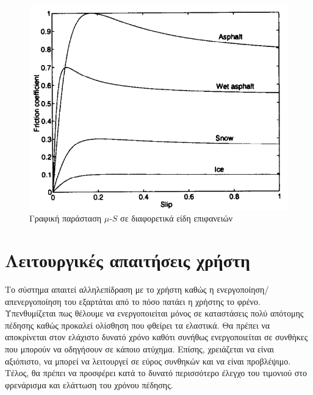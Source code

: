 \documentclass{article}
\begin{document}
\begin{figure}[H]
    \begin{center}
    \includegraphics[scale=0.4]{images/slip-friction-diagram.png}
    \end{center}
    \caption{Γραφική παράσταση $\mu$-$S$ σε διαφορετικά είδη επιφανειών \cite{10.1016/S0005-1098(97)00003-4}}
    \label{fig:slip-friction-diagram}
\end{figure}

\section{Λειτουργικές απαιτήσεις χρήστη}
Το σύστημα απαιτεί αλληλεπίδραση με το χρήστη καθώς η ενεργοποίηση/απενεργο\-ποίηση του εξαρτάται από το πόσο πατάει η χρήστης το φρένο. Υπενθυμίζεται πως θέλουμε να ενεργοποιείται μόνος σε καταστάσεις πολύ απότομης πέδησης καθώς προκαλεί ολίσθηση που φθείρει τα ελαστικά. Θα πρέπει να αποκρίνεται στον ελάχιστο δυνατό χρόνο καθότι συνήθως ενεργοποιείται σε συνθήκες που μπορούν να οδηγήσουν σε κάποιο ατύχημα. Επίσης, χρειάζεται να είναι αξιόπιστο, να μπορεί να λειτουργεί σε εύρος συνθηκών και να είναι προβλέψιμο. Τέλος, θα πρέπει να προσφέρει κατά το δυνατό περισσότερο έλεγχο του τιμονιού στο φρενάρισμα και ελάττωση του χρόνου πέδησης.

\newpage
\end{document}
